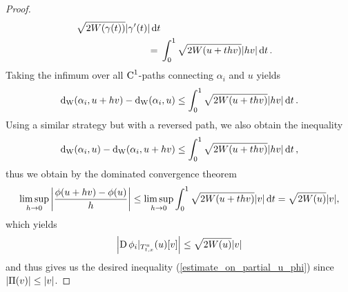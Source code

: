 \begin{proof}
\begin{align*}
			\sqrt{ 2 W ( \gamma ( t ) ) } 
			\abs{ \gamma ' ( t ) }
		\dd{ t }
		\\
		={} &
		\int_{ 0 }^{ 1 }
			\sqrt{ 2 W ( u + t h v ) }
			\abs{ h v }
		\dd{ t }.
	\end{align*}
	Taking the infimum over all $ \operatorname{C}^{ 1 } $-paths connecting $ \alpha_{ i } $ and $ u $ yields 
	\begin{equation*}
		\geodesic_distance ( \alpha_{ i } , u + h v )
		- 
		\geodesic_distance ( \alpha_{ i } , u )
		\leq
		\int_{ 0 }^{ 1 }
			\sqrt{ 2 W ( u + t h v ) }
			\abs{ h v }
		\dd{ t }.
	\end{equation*}
	Using a similar strategy but with a reversed path, we also obtain the inequality
	\begin{equation*}
		\geodesic_distance ( \alpha_{ i } , u ) 
		-
		\geodesic_distance ( \alpha_{ i } , u + h v )
		\leq
		\int_{ 0 }^{ 1 }
			\sqrt{ 2 W ( u + t h v ) }
			\abs{ h v }
		\dd{ t },
	\end{equation*}
	thus we obtain by the dominated convergence theorem
	\begin{equation*}
		\limsup_{ h \to 0 }
			\abs{
			\frac{ \phi ( u + h v ) - \phi ( u ) }{ h }
			}
		\leq
		\limsup_{ h \to 0 }
			\int_{ 0 }^{ 1 }
				\sqrt{ 2 W ( u + t h v ) }
				\abs{ v }
			\dd{ t }
		= 
		\sqrt{ 2 W ( u ) } \abs{ v },
	\end{equation*}
	which yields
	\begin{equation*}
		\abs{ \operatorname{D} \phi_{ i } |_{ T_{ t, x }^{ u } } ( u ) [ v ] }
		\leq
		\sqrt{ 2 W ( u ) } \abs{ v }
	\end{equation*}
	and thus gives us the desired inequality (\ref{estimate_on_partial_u_phi}) since $ \abs{ \Pi ( v ) } \leq \abs{ v } $.
	

\end{proof}

